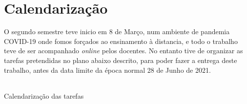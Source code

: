 \section{Calendarização}
O segundo semestre teve inicio em 8 de Março, num ambiente de pandemia COVID-19 onde fomos forçados ao ensinamento à distancia, e todo o trabalho teve de ser acompanhado \textit{online} pelos docentes. No entanto tive de organizar as tarefas pretendidas no plano abaixo descrito, para poder fazer a entrega deste trabalho, antes da data limite da época normal 28 de Junho de 2021.
\\
\\
\begin{table}[H]
	\caption{Calendarização das tarefas}
	\begin{ganttchart}{1}{20}
		\\
		\\
		 \\
		 \\
		 \\
		\\
		 \\
		 \\
		 \\%
		 \\%
		\\
		 \\
		 \\
		 \\
		 \\
	\end{ganttchart}
	\label{gantt}
\end{table}
\newpage
